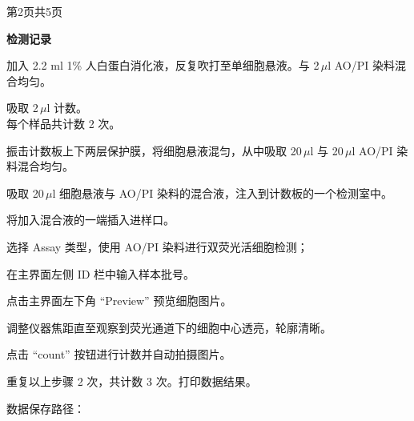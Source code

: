 \documentclass[UTF8,10pt,a4paper,fontset=fandol]{ctexart}
\newcommand{\fieldvalue}[1]{#1}
\newcommand{\handwritten}[1]{#1}
\begin{document}
\begin{center}
第2页\quad 共5页
\end{center}

\newpage

\noindent
\begin{minipage}{\textwidth}
\small
\textbf{检测记录}

加入 2.2 ml 1\% 人白蛋白消化液，反复吹打至单细胞悬液。与 2\,$\mu$l AO/PI 染料混合均匀。

\begin{flushright}
吸取
\fieldvalue{\handwritten{2\,$\mu$l}}
计数。\\
每个样品共计数
\fieldvalue{\handwritten{2}}
次。
\end{flushright}

振击计数板上下两层保护膜，将细胞悬液混匀，从中吸取 20\,$\mu$l 与 20\,$\mu$l AO/PI 染料混合均匀。

吸取 20\,$\mu$l 细胞悬液与 AO/PI 染料的混合液，注入到计数板的一个检测室中。

将加入混合液的一端插入进样口。

选择 Assay 类型，使用 AO/PI 染料进行双荧光活细胞检测；

在主界面左侧 ID 栏中输入样本批号。

点击主界面左下角 ``Preview'' 预览细胞图片。

调整仪器焦距直至观察到荧光通道下的细胞中心透亮，轮廓清晰。

点击 ``count'' 按钮进行计数并自动拍摄图片。

重复以上步骤 2 次，共计数 3 次。打印数据结果。

数据保存路径：
\fieldvalue{\handwritten{\text{[路径难以辨认]}}}


\end{minipage}
\end{document}
